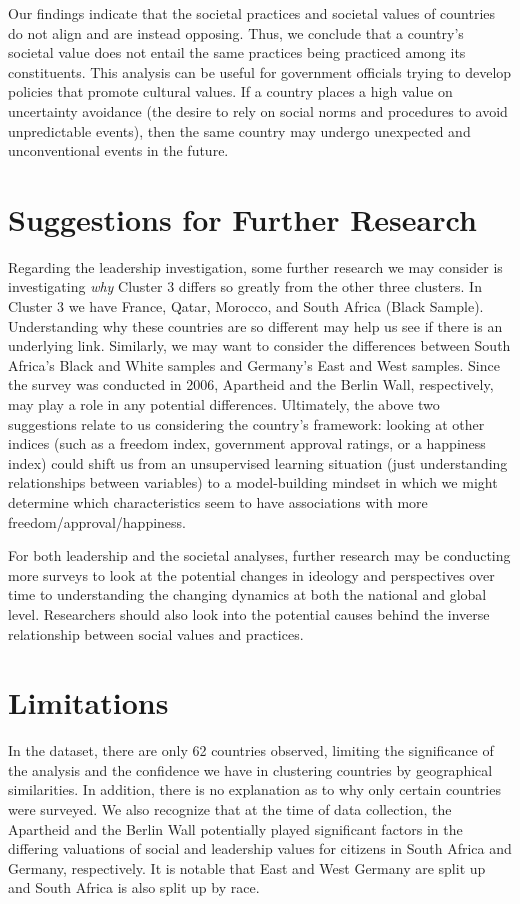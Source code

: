 \documentclass[
]{article}
\begin{document}
Our findings indicate that the societal practices and societal values of
countries do not align and are instead opposing. Thus, we conclude that
a country's societal value does not entail the same practices being
practiced among its constituents. This analysis can be useful for
government officials trying to develop policies that promote cultural
values. If a country places a high value on uncertainty avoidance (the
desire to rely on social norms and procedures to avoid unpredictable
events), then the same country may undergo unexpected and unconventional
events in the future.

\hypertarget{suggestions-for-further-research}{%
\section{Suggestions for Further
Research}\label{suggestions-for-further-research}}

Regarding the leadership investigation, some further research we may
consider is investigating \emph{why} Cluster 3 differs so greatly from
the other three clusters. In Cluster 3 we have France, Qatar, Morocco,
and South Africa (Black Sample). Understanding why these countries are
so different may help us see if there is an underlying link. Similarly,
we may want to consider the differences between South Africa's Black and
White samples and Germany's East and West samples. Since the survey was
conducted in 2006, Apartheid and the Berlin Wall, respectively, may play
a role in any potential differences. Ultimately, the above two
suggestions relate to us considering the country's framework: looking at
other indices (such as a freedom index, government approval ratings, or
a happiness index) could shift us from an unsupervised learning
situation (just understanding relationships between variables) to a
model-building mindset in which we might determine which characteristics
seem to have associations with more freedom/approval/happiness.

For both leadership and the societal analyses, further research may be
conducting more surveys to look at the potential changes in ideology and
perspectives over time to understanding the changing dynamics at both
the national and global level. Researchers should also look into the
potential causes behind the inverse relationship between social values
and practices.

\hypertarget{limitations}{%
\section{Limitations}\label{limitations}}

In the dataset, there are only 62 countries observed, limiting the
significance of the analysis and the confidence we have in clustering
countries by geographical similarities. In addition, there is no
explanation as to why only certain countries were surveyed. We also
recognize that at the time of data collection, the Apartheid and the
Berlin Wall potentially played significant factors in the differing
valuations of social and leadership values for citizens in South Africa
and Germany, respectively. It is notable that East and West Germany are
split up and South Africa is also split up by race.
\end{document}
